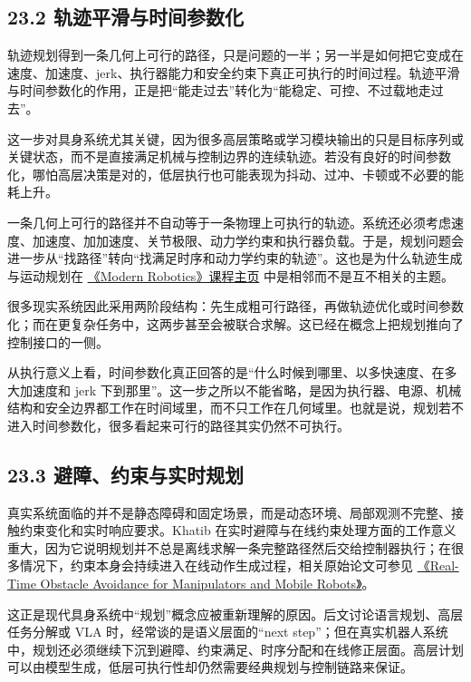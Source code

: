 \subsection*{23.2 轨迹平滑与时间参数化}


轨迹规划得到一条几何上可行的路径，只是问题的一半；另一半是如何把它变成在速度、加速度、jerk、执行器能力和安全约束下真正可执行的时间过程。轨迹平滑与时间参数化的作用，正是把“能走过去”转化为“能稳定、可控、不过载地走过去”。

这一步对具身系统尤其关键，因为很多高层策略或学习模块输出的只是目标序列或关键状态，而不是直接满足机械与控制边界的连续轨迹。若没有良好的时间参数化，哪怕高层决策是对的，低层执行也可能表现为抖动、过冲、卡顿或不必要的能耗上升。

一条几何上可行的路径并不自动等于一条物理上可执行的轨迹。系统还必须考虑速度、加速度、加加速度、关节极限、动力学约束和执行器负载。于是，规划问题会进一步从“找路径”转向“找满足时序和动力学约束的轨迹”。这也是为什么轨迹生成与运动规划在 \href{https://modernrobotics.org/}{《Modern Robotics》课程主页} 中是相邻而不是互不相关的主题。

很多现实系统因此采用两阶段结构：先生成粗可行路径，再做轨迹优化或时间参数化；而在更复杂任务中，这两步甚至会被联合求解。这已经在概念上把规划推向了控制接口的一侧。

从执行意义上看，时间参数化真正回答的是“什么时候到哪里、以多快速度、在多大加速度和 jerk 下到那里”。这一步之所以不能省略，是因为执行器、电源、机械结构和安全边界都工作在时间域里，而不只工作在几何域里。也就是说，规划若不进入时间参数化，很多看起来可行的路径其实仍然不可执行。

\subsection*{23.3 避障、约束与实时规划}


真实系统面临的并不是静态障碍和固定场景，而是动态环境、局部观测不完整、接触约束变化和实时响应要求。Khatib 在实时避障与在线约束处理方面的工作意义重大，因为它说明规划并不总是离线求解一条完整路径然后交给控制器执行；在很多情况下，约束本身会持续进入在线动作生成过程，相关原始论文可参见 \href{https://khatib.stanford.edu/publications/pdfs/Khatib_1986_IJRR.pdf}{《Real-Time Obstacle Avoidance for Manipulators and Mobile Robots》}。

这正是现代具身系统中“规划”概念应被重新理解的原因。后文讨论语言规划、高层任务分解或 VLA 时，经常谈的是语义层面的“next step”；但在真实机器人系统中，规划还必须继续下沉到避障、约束满足、时序分配和在线修正层面。高层计划可以由模型生成，低层可执行性却仍然需要经典规划与控制链路来保证。


